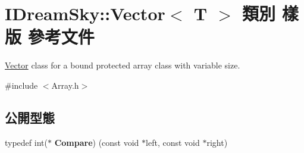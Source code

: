 \hypertarget{class_i_dream_sky_1_1_vector}{}\section{I\+Dream\+Sky\+:\+:Vector$<$ T $>$ 類別 樣版 參考文件}
\label{class_i_dream_sky_1_1_vector}


\hyperlink{class_i_dream_sky_1_1_vector}{Vector} class for a bound protected array class with variable size.  




{\ttfamily \#include $<$Array.\+h$>$}

\subsection*{公開型態}
\begin{DoxyCompactItemize}
\item 
typedef int($\ast$ {\bfseries Compare}) (const void $\ast$left, const void $\ast$right)\hypertarget{class_i_dream_sky_1_1_vector_a6a7a2702845d28ffae640b7596e983ee}{}\label{class_i_dream_sky_1_1_vector_a6a7a2702845d28ffae640b7596e983ee}

\end{DoxyCompactItemize}
